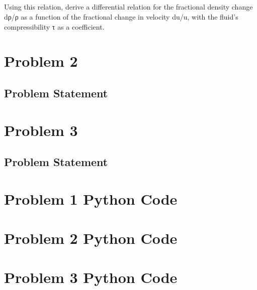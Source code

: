 \documentclass[12pt,letterpaper]{article}
\begin{document}
	\subsection{}
	Using this relation, derive a differential relation for the fractional density change dρ/ρ as
	a function of the fractional change in velocity du/u, with the fluid’s compressibility τ as a
	coefficient.
	\subsection{}
	\subsection{}
	\subsection{}
	\subsection{}
	\subsection{}
	\newpage
	
	\section{Problem 2}
	\subsection{Problem Statement}
	\newpage
	
	\section{Problem 3}
	\subsection{Problem Statement}
	\newpage
	
	\begin{appendices}
		\section{Problem 1 Python Code}
		
		\newpage
		\section{Problem 2 Python Code}
		\newpage
		\section{Problem 3 Python Code}
		\newpage
	\end{appendices}
	
	
	
\end{document}
